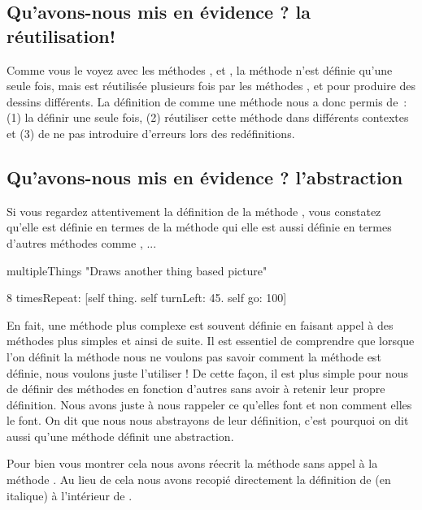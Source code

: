 \subsection{Qu'avons-nous mis en \'evidence ? la r\'eutilisation!}
Comme vous le voyez avec les m\'ethodes ,
 et , la m\'ethode 
n'est d\'efinie qu'une seule fois, mais est r\'eutilis\'ee plusieurs
fois par les m\'ethodes ,  et
 pour produire des dessins diff\'erents. 
La d\'efinition de  comme une m\'ethode nous a donc permis
de~: (1) la d\'efinir une seule fois, (2) r\'eutiliser cette m\'ethode
dans diff\'erents contextes et (3) de ne pas introduire d'erreurs lors
des red\'efinitions.

\subsection{Qu'avons-nous mis en \'evidence ? l'abstraction}
Si vous regardez attentivement la d\'efinition de la m\'ethode
, vous constatez qu'elle est d\'efinie en termes de la 
m\'ethode  qui elle est aussi d\'efinie en termes d'autres
m\'ethodes comme \go, \turnLeft...

\begin{nmethode}
multipleThings
   "Draws another thing based picture"

   8 timesRepeat: [self thing. 
                  self turnLeft: 45. 
                  self go: 100]
\end{nmethode}

En fait, une m\'ethode plus complexe est souvent d\'efinie en faisant
appel \`a des m\'ethodes plus simples et ainsi de suite. 
Il est essentiel de comprendre que lorsque l'on d\'efinit la m\'ethode
 nous ne voulons pas savoir comment la m\'ethode
 est d\'efinie, nous voulons juste l'utiliser ! 
De cette fa\c con, il est plus simple pour nous de d\'efinir des
m\'ethodes en fonction d'autres sans avoir \`a retenir leur propre
d\'efinition. Nous avons juste \`a nous rappeler ce qu'elles font et
non comment elles le font. On dit que nous nous abstrayons de leur
d\'efinition, c'est pourquoi on dit aussi qu'une m\'ethode d\'efinit
une abstraction.

Pour bien vous montrer cela nous avons r\'eecrit la m\'ethode
 sans appel \`a la m\'ethode . 
Au lieu de cela nous avons recopi\'e directement la d\'efinition de
 (en italique) \`a l'int\'erieur de .

